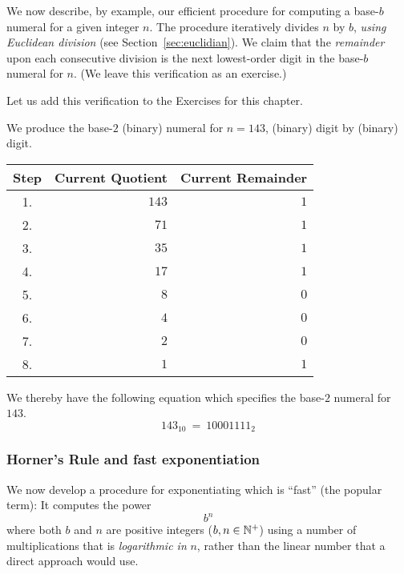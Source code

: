 \noindent
We now describe, by example, our efficient procedure for computing a
base-$b$ numeral for a given integer $n$.  The procedure iteratively
divides $n$ by $b$, {\em using Euclidean division} (see
Section~\ref{sec:euclidian}).  We claim that the {\em remainder} upon
each consecutive division is the next lowest-order digit in the
base-$b$ numeral for $n$.  (We leave this verification as an
exercise.)

{\Arny Let us add this verification to the Exercises for this chapter.}

\bigskip

We produce the base-$2$ (binary) numeral for $n = 143$, (binary) digit
by (binary) digit.

\medskip

\begin{tabular}{|c|r|r|}
\hline
Step &
Current Quotient &
Current Remainder \\
\hline
1. & $143$ & $1$ \\
2. & $71$  & $1$ \\
3. & $35$  & $1$ \\
4. & $17$  & $1$ \\
5. & $8$   & $0$ \\
6. & $4$   & $0$ \\
7. & $2$   & $0$ \\
8. & $1$   & $1$ \\
\hline
\end{tabular}

\medskip

\noindent
We thereby have the following equation which specifies the base-$2$
numeral for $143$.
\[ 143_{10} \ = \ 10001111_2 \]


\subsubsection{Horner's Rule and fast exponentiation} 

We now develop a procedure for exponentiating which is ``fast'' (the
popular term): It computes the power
\[ b^n \]
where both $b$ and $n$ are positive integers ($b, n \in \mathbb{N}^+$) using a
number of multiplications that is {\em logarithmic in} $n$, rather
than the linear number that a direct approach would use.

\medskip

\noindent {}

